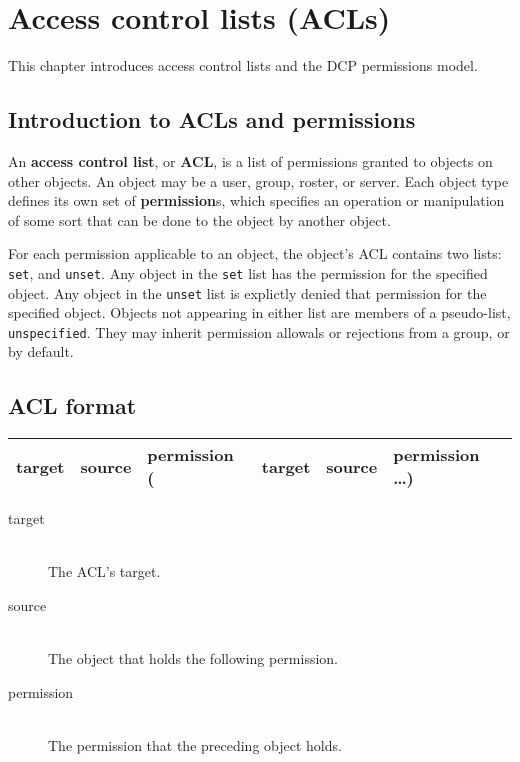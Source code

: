 \chapter{Access control lists (ACLs)}
\label{chap:acls}

This chapter introduces access control lists and the DCP permissions model.

\newpage



\section{Introduction to ACLs and permissions}
\sectionrule

An \textbf{access control list}, or \textbf{ACL}, is a list of permissions
granted to objects on other objects.  An object may be a user, group, roster, or
server.  Each object type defines its own set of \textbf{permission}s, which
specifies an operation or manipulation of some sort that can be done to the
object by another object.

For each permission applicable to an object, the object's ACL contains two
lists: \texttt{set}, and \texttt{unset}.  Any object in the \texttt{set} list
has the permission for the specified object.  Any object in the \texttt{unset}
list is explictly denied that permission for the specified object.  Objects not
appearing in either list are members of a pseudo-list, \texttt{unspecified}.
They may inherit permission allowals or rejections from a group, or by default.



\section{ACL format}
\sectionrule
\label{acl:format}

\begin{tabular}{l|l|l|l|l|l}
  \hline
  target & source & permission ( & target & source & permission \ldots ) \\
  \hline
\end{tabular}

\begin{description}
  \item[target] \hfill \\
  The ACL's target.
  
  \item[source] \hfill \\
  The object that holds the following permission.
  
  \item[permission] \hfill \\
  The permission that the preceding object holds.
\end{description}



